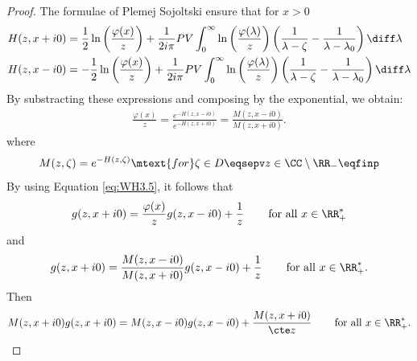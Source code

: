 \begin{proof}
The formulae of Plemej Sojoltski  ensure that for $x > 0$
    \begin{align*}
        H(z,x+i0) &= \frac{1}{2} \ln\left(\frac{\varphi(x)}{z}\right) + \frac{1}{2i\pi } PV\int_0^\infty \ln\left(\frac{\varphi(\lambda)}{z}\right) \left( \frac{1}{\lambda-\zeta} - \frac{1}{\lambda-\lambda_0}\right) \diff \lambda\\
        H(z,x-i0) &= -\frac{1}{2} \ln\left(\frac{\varphi(x)}{z}\right) + \frac{1}{2i\pi } PV\int_0^\infty \ln\left(\frac{\varphi(\lambda)}{z}\right)\left( \frac{1}{\lambda-\zeta} - \frac{1}{\lambda-\lambda_0}\right) \diff \lambda
    \end{align*}
By substracting these expressions and composing by the exponential, we obtain:
\begin{align*}
    \frac{\varphi(x)}{z}
    = \frac{e^{-H(z,x-i0)}}{e^{-H(z,x+i0)}} 
    = \frac{M(z,x-i0)}{M(z,x+i0)}.
\end{align*}
where 
\begin{equation}
    M(z,\zeta) = e^{-H(z,\zeta)}
    \mtext{for}
    \zeta \in D
    \eqsepv z \in \CC \setminus \RR_- \eqfinp
    \label{def:M}
\end{equation}
By using Equation \eqref{eq:WH3.5}, it follows that 
\begin{align*}
    g(z, x+i0) = \frac{\varphi(x)}{z} g(z, x-i0) + \frac{1}{z} \, \qquad \text{for all $x\in\RR_+^*$}
\end{align*}
and 
\begin{align*}
    g(z, x+i0) = \frac{M(z,x-i0)}{M(z,x+i0)} g(z, x-i0) + \frac{1}{z} \, \qquad \text{for all $x\in\RR_+^*$}.
\end{align*}
Then 
\begin{align*}
    M(z,x+i0)g(z, x+i0) = M(z,x-i0)g(z, x-i0) + \frac{M(z,x+i0)}{\cte  z} \, \qquad \text{for all $x\in\RR_+^*$}.
\end{align*}


\end{proof}
